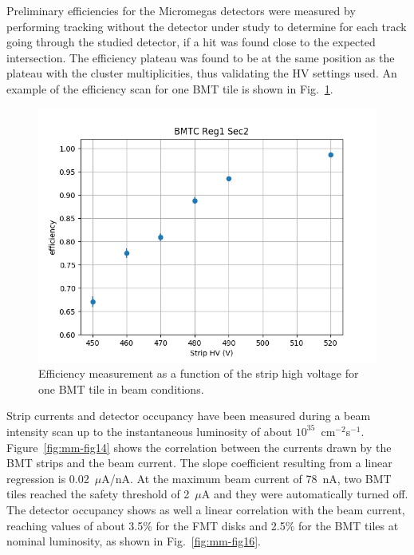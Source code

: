 Preliminary efficiencies for the Micromegas detectors were measured by performing tracking without the detector under study
to determine for each track going through the studied detector, if a hit was found close to the expected intersection. The
efficiency plateau was found to be at the same position as the plateau with the cluster multiplicities, thus validating the HV
settings used. An example of the efficiency scan for one BMT tile is shown in Fig.~\ref{fig:mm-eff_scan}.

\begin{figure}[htb]
 \includegraphics[width=1.0\columnwidth,keepaspectratio]{images/hvscan_BMTC_R1_S2.png}
 \caption{Efficiency measurement as a function of the strip high voltage for one BMT tile in beam conditions.}
 \label{fig:mm-eff_scan}
\end{figure}

Strip currents and detector occupancy have been measured during a beam intensity scan up to the instantaneous luminosity of
about $10^{35}$~cm$^{-2}$s$^{-1}$. Figure~\ref{fig:mm-fig14} shows the correlation between the currents drawn by the BMT
strips and the beam current. The slope coefficient resulting from a linear regression is 0.02~$\mu$A/nA. At the maximum
beam current of 78~nA, two BMT tiles reached the safety threshold of 2~$\mu$A and they were automatically turned off. The
detector occupancy shows as well a linear correlation with the beam current, reaching values of about 3.5\% for the FMT disks
and 2.5\% for the BMT tiles at nominal luminosity, as shown in Fig.~\ref{fig:mm-fig16}.

